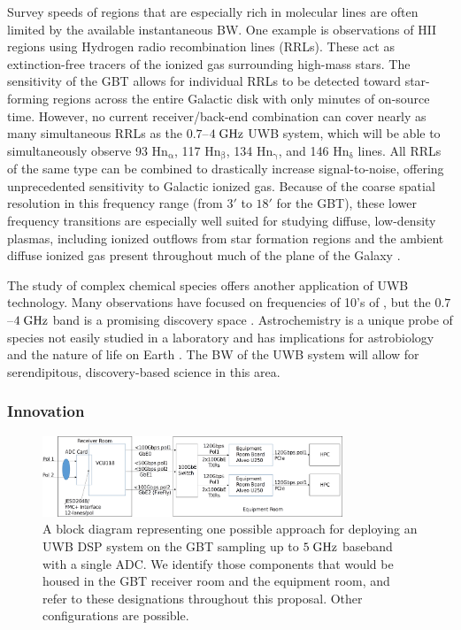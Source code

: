 \documentclass[10pt]{myNSF}
\begin{document}
 Survey
speeds of regions that are especially rich in molecular lines are
often limited by the available instantaneous BW.  One example is
observations of H{\sc II} regions using Hydrogen radio recombination
lines (RRLs).  These act as extinction-free tracers of the ionized gas
surrounding high-mass stars.  The sensitivity of the GBT allows for
individual RRLs to be detected toward star-forming regions across the
entire Galactic disk with only minutes of on-source time.  However, no
current receiver/back-end combination can cover nearly as many
simultaneous RRLs as the $0.7$--$4\; \textrm{GHz}$ UWB system, which will be
able to simultaneously observe 93 $\mathrm{Hn_\alpha}$, 117
$\mathrm{Hn_\beta}$, 134 $\mathrm{Hn_\gamma}$, and 146
$\mathrm{Hn_\delta}$ lines. All RRLs of the same type can be combined
to drastically increase signal-to-noise, offering unprecedented
sensitivity to Galactic ionized gas.  Because of the coarse spatial
resolution in this frequency range (from $3'$ to $18'$ for the GBT),
these lower frequency transitions are especially well suited for
studying diffuse, low-density plasmas, including ionized outflows from
star formation regions and the ambient diffuse ionized gas present
throughout much of the plane of the Galaxy \cite{lab+17}.

The study of complex chemical species offers another application of
UWB technology.  Many observations have focused on frequencies of 10's
of \GHz, but the $0.7$--$4\; \textrm{GHz}$ band is a promising discovery space
\citep[e.g.][]{mlc+12,frsw14,thc+17}.  Astrochemistry is a unique
probe of species not easily studied in a laboratory and has
implications for astrobiology and the nature of life on Earth
\cite{mcl+16}.  The BW of the UWB system will allow for serendipitous,
discovery-based science in this area.

\subsubsection{Innovation}
\label{sec:innovation}

\begin{figure}
  \centering
  \includegraphics[width=0.8\textwidth]{topologies.png}
  \caption{A block diagram representing one possible approach for
    deploying an UWB DSP system on the GBT sampling up to $5\; \textrm{GHz}$
    baseband with a single ADC.  We identify those components that
    would be housed in the GBT receiver room and the equipment room,
    and refer to these designations throughout this proposal. Other
    configurations are possible.  \label{fig:block_diagram}}
\end{figure}
\end{document}
